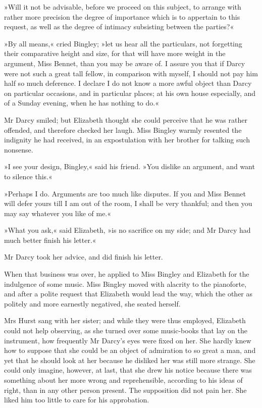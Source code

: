 »Will it not be advisable, before we proceed on this subject, to arrange with rather more precision the degree of importance which is to appertain to this request, as well as the degree of intimacy subsisting between the parties?«

»By all means,« cried Bingley; »let us hear all the particulars, not forgetting their comparative height and size, for that will have more weight in the argument, Miss Bennet, than you may be aware of. I assure you that if Darcy were not such a great tall fellow, in comparison with myself, I should not pay him half so much deference. I declare I do not know a more awful object than Darcy on particular occasions, and in particular places; at his own house especially, and of a Sunday evening, when he has nothing to do.«

Mr Darcy smiled; but Elizabeth thought she could perceive that he was rather offended, and therefore checked her laugh. Miss Bingley warmly resented the indignity he had received, in an expostulation with her brother for talking such nonsense.

»I see your design, Bingley,« said his friend. »You dislike an argument, and want to silence this.«

»Perhaps I do. Arguments are too much like disputes. If you and Miss Bennet will defer yours till I am out of the room, I shall be very thankful; and then you may say whatever you like of me.«

»What you ask,« said Elizabeth, »is no sacrifice on my side; and Mr Darcy had much better finish his letter.«

Mr Darcy took her advice, and did finish his letter.

When that business was over, he applied to Miss Bingley and Elizabeth for the indulgence of some music. Miss Bingley moved with alacrity to the pianoforte, and after a polite request that Elizabeth would lead the way, which the other as politely and more earnestly negatived, she seated herself.

Mrs Hurst sang with her sister; and while they were thus employed, Elizabeth could not help observing, as she turned over some music-books that lay on the instrument, how frequently Mr Darcy's eyes were fixed on her. She hardly knew how to suppose that she could be an object of admiration to so great a man, and yet that he should look at her because he disliked her was still more strange. She could only imagine, however, at last, that she drew his notice because there was something about her more wrong and reprehensible, according to his ideas of right, than in any other person present. The supposition did not pain her. She liked him too little to care for his approbation.

